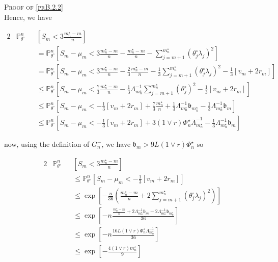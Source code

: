 \begin{pro}{\textsc{Proof of \textsc{\cref{prB.2.2}}} \\}
Hence, we have

\begin{alignat*}{2}
& \mathds{P}_{\theta^{\circ}}^{n} && \left[S_{m} < 3 \frac{m_{n}^{\star} - m}{n}\right] \\
& && = \mathds{P}_{\theta^{\circ}}^{n}\left[S_{m} - \mu_{m} < 3 \frac{m_{n}^{\star} - m}{n} - \frac{m_{n}^{\star} - m}{n} - \sum\limits_{j = m+1}^{m_{n}^{\star}}\left(\theta^{\circ}_{j}\lambda_{j}\right)^{2}\right]\\
& && = \mathds{P}_{\theta^{\circ}}^{n}\left[S_{m} - \mu_{m} < 3 \frac{m_{n}^{\star} - m}{n} - \frac{2}{3} \frac{m_{n}^{\star} - m}{n} - \frac{1}{3}\sum\limits_{j = m+1}^{m_{n}^{\star}}\left(\theta^{\circ}_{j}\lambda_{j}\right)^{2} - \frac{1}{3} \left[v_{m} + 2 r_{m}\right]\right]\\
& && \leq \mathds{P}_{\theta^{\circ}}^{n}\left[S_{m} - \mu_{m} < \frac{7}{3} \frac{m_{n}^{\star} - m}{n} - \frac{1}{3} \Lambda_{m_{n}^{\star}}^{-1}\sum\limits_{j = m+1}^{m_{n}^{\star}}\left(\theta^{\circ}_{j}\right)^{2} - \frac{1}{3} \left[v_{m} + 2 r_{m}\right]\right]\\
& && \leq \mathds{P}_{\theta^{\circ}}^{n}\left[S_{m} - \mu_{m} <  - \frac{1}{3} \left[v_{m} + 2 r_{m}\right] + \frac{7}{3} \frac{m_{n}^{\star}}{n} + \frac{1}{3} \Lambda_{m_{n}^{\star}}^{-1}\mathfrak{b}_{m_{n}^{\star}} - \frac{1}{3} \Lambda_{m_{n}^{\star}}^{-1}\mathfrak{b}_{m}\right]\\
& && \leq \mathds{P}_{\theta^{\circ}}^{n}\left[S_{m} - \mu_{m} < - \frac{1}{3} \left[v_{m} + 2 r_{m}\right] + 3 \left(1 \vee r\right) \Phi_{n}^{\star} \overline{\Lambda}_{m_{n}^{\star}}^{-1} - \frac{1}{3}\Lambda_{m_{n}^{\star}}^{-1}\mathfrak{b}_{m}\right]
\end{alignat*}

now, using the definition of $G_{n}^{-}$, we have $\mathfrak{b}_{m} > 9 L \left(1 \vee r\right)\Phi_{n}^{\star}$ so

\begin{alignat*}{2}
& \mathds{P}_{\theta^{\circ}}^{n}&&\left[S_{m} < 3 \frac{m_{n}^{\star} - m}{n}\right]\\
& && \leq \mathds{P}_{\theta^{\circ}}^{n}\left[S_{m} - \mu_{m} < - \frac{1}{3} \left[v_{m} + 2 r_{m}\right]\right]\\
& && \leq \exp\left[- \frac{n}{36}\left(\frac{m_{n}^{\star} - m}{n} + 2 \sum\limits_{j = m + 1}^{m_{n}^{\star}}\left(\theta^{\circ}_{j}\lambda_{j}\right)^{2}\right)\right]\\
& && \leq \exp\left[- n \frac{\frac{m_{n}^{\star} - m}{n} + 2 \Lambda_{m_{n}^{\star}}^{-1}\mathfrak{b}_{m} - 2 \Lambda_{m_{n}^{\star}}^{-1}\mathfrak{b}_{m_{n}^{\star}}}{36}\right]\\
& && \leq \exp\left[- n\frac{16 L \left(1 \vee r\right) \Phi_{n}^{\star} \Lambda_{m_{n}^{\star}}^{-1}}{36}\right]\\
& && \leq \exp \left[ - \frac{4 \left(1 \vee r\right)m_{n}^{\star}}{9} \right]
\end{alignat*}


\end{pro}
